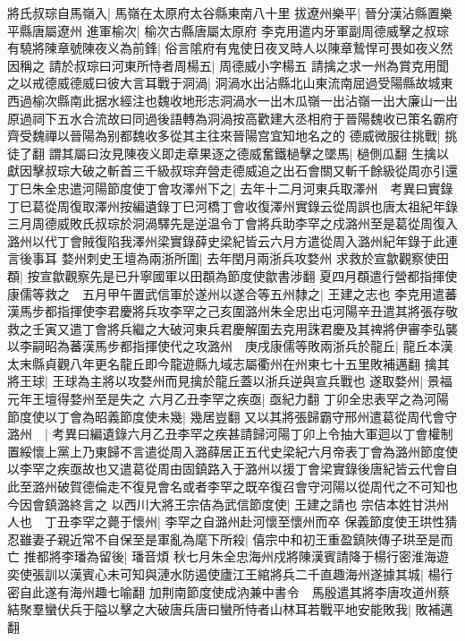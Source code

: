 將氏叔琮自馬嶺入|{
	馬嶺在太原府太谷縣東南八十里}
拔遼州樂平|{
	晉分漢沾縣置樂平縣唐屬遼州}
進軍榆次|{
	榆次古縣唐屬太原府}
李克用遣内牙軍副周德威擊之叔琮有驍將陳章號陳夜义為前鋒|{
	俗言隂府有鬼使日夜叉時人以陳章鷙悍可畏如夜义然因稱之}
請於叔琮曰河東所恃者周楊五|{
	周德威小字楊五}
請擒之求一州為賞克用聞之以戒德威德威曰彼大言耳戰于洞渦|{
	洞渦水出沾縣北山東流南屈過受陽縣故城東西過榆次縣南此据水經注也魏收地形志洞渦水一出木瓜嶺一出沾嶺一出大廉山一出原過祠下五水合流故曰同過後語轉為洞渦按高歡建大丞相府于晉陽魏收已策名霸府齊受魏禪以晉陽為别都魏收多從其主往來晉陽宫宜知地名之的}
德威微服往挑戰|{
	挑徒了翻}
謂其屬曰汝見陳夜义即走章果逐之德威奮鐵檛擊之墜馬|{
	檛側瓜翻}
生擒以獻因擊叔琮大破之斬首三千級叔琮弃營走德威追之出石會關又斬千餘級從周亦引還　丁巳朱全忠遣河陽節度使丁會攻澤州下之|{
	去年十二月河東兵取澤州　考異曰實錄丁巳葛從周復取澤州按編遺錄丁巳河橋丁會收復澤州實錄云從周誤也唐太祖紀年錄三月周德威敗氏叔琮於洞渦驛先是逆温令丁會將兵助李罕之戍潞州至是葛從周復入潞州以代丁會賊復陷我澤州梁實錄薛史梁紀皆云六月方遣從周入潞州紀年錄于此連言後事耳}
婺州刺史王壇為兩浙所圍|{
	去年閏月兩浙兵攻婺州}
求救於宣歙觀察使田頵|{
	按宣歙觀察先是已升寧國軍以田頵為節度使歙書涉翻}
夏四月頵遣行營都指揮使康儒等救之　五月甲午置武信軍於遂州以遂合等五州隸之|{
	王建之志也}
李克用遣蕃漢馬步都指揮使李君慶將兵攻李罕之己亥圍潞州朱全忠出屯河陽辛丑遣其將張存敬救之壬寅又遣丁會將兵繼之大破河東兵君慶解圍去克用誅君慶及其禆將伊審李弘襲以李嗣昭為蕃漢馬步都指揮使代之攻潞州　庚戌康儒等敗兩浙兵於龍丘|{
	龍丘本漢太末縣貞觀八年更名龍丘即今龍遊縣九域志屬衢州在州東七十五里敗補邁翻}
擒其將王球|{
	王球為主將以攻婺州而見擒於龍丘蓋以浙兵逆與宣兵戰也}
遂取婺州|{
	景福元年王壇得婺州至是失之}
六月乙丑李罕之疾亟|{
	亟紀力翻}
丁卯全忠表罕之為河陽節度使以丁會為昭義節度使未幾|{
	幾居豈翻}
又以其將張歸霸守邢州遣葛從周代會守潞州　|{
	考異曰編遺錄六月乙丑李罕之疾甚請歸河陽丁卯上令抽大軍迴以丁會權制置綏懷上黨上乃東歸不言遣從周入潞薛居正五代史梁紀六月帝表丁會為潞州節度使以李罕之疾亟故也又遣葛從周由固鎮路入于潞州以援丁會梁實錄後唐紀皆云代會自此至潞州破賀德倫走不復見會名或者李罕之既卒復召會守河陽以從周代之不可知也今因會鎮潞終言之}
以西川大將王宗佶為武信節度使|{
	王建之請也}
宗佶本姓甘洪州人也　丁丑李罕之薨于懷州|{
	李罕之自潞州赴河懷至懷州而卒}
保義節度使王珙性猜忍雖妻子親近常不自保至是軍亂為麾下所殺|{
	僖宗中和初王重盈鎮陜傳子珙至是而亡}
推都將李璠為留後|{
	璠音煩}
秋七月朱全忠海州戍將陳漢賓請降于楊行密淮海遊奕使張訓以漢賓心未可知與漣水防遏使廬江王綰將兵二千直趣海州遂據其城|{
	楊行密自此遂有海州趣七喻翻}
加荆南節度使成汭兼中書令　馬殷遣其將李唐攻道州蔡結聚羣蠻伏兵于隘以擊之大破唐兵唐曰蠻所恃者山林耳若戰平地安能敗我|{
	敗補邁翻}
